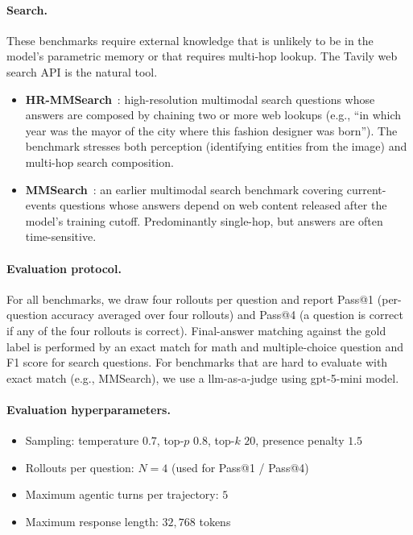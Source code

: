 \documentclass{llmxive}
\begin{document}
\paragraph{Search.} These benchmarks require external knowledge that is unlikely to be in the model's parametric memory or that requires multi-hop lookup. The Tavily web search API is the natural tool.
\begin{itemize}[leftmargin=*, itemsep=2pt]
    \item \textbf{HR-MMSearch}~\citep{hrmmsearch}: high-resolution multimodal search questions whose answers are composed by chaining two or more web lookups (e.g., ``in which year was the mayor of the city where this fashion designer was born''). The benchmark stresses both perception (identifying entities from the image) and multi-hop search composition.
    \item \textbf{MMSearch}~\citep{mmsearch}: an earlier multimodal search benchmark covering current-events questions whose answers depend on web content released after the model's training cutoff. Predominantly single-hop, but answers are often time-sensitive.
\end{itemize}

\paragraph{Evaluation protocol.} For all benchmarks, we draw four rollouts per question and report Pass@1 (per-question accuracy averaged over four rollouts) and Pass@4 (a question is correct if any of the four rollouts is correct). Final-answer matching against the gold label is performed by an exact match for math and multiple-choice question and F1 score for search questions. For benchmarks that are hard to evaluate with exact match (e.g., MMSearch), we use a llm-as-a-judge using gpt-5-mini model. 

\paragraph{Evaluation hyperparameters.}
\begin{itemize}[leftmargin=*, itemsep=2pt]
    \item Sampling: temperature $0.7$, top-$p$ $0.8$, top-$k$ $20$, presence penalty $1.5$
    \item Rollouts per question: $N = 4$ (used for Pass@1 / Pass@4)
    \item Maximum agentic turns per trajectory: $5$
    \item Maximum response length: $32{,}768$ tokens
\end{itemize}
\end{document}
